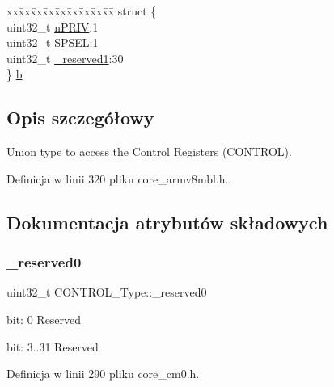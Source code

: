 \begin{DoxyCompactItemize}
\begin{tabbing}
\end{tabbing}\item 
\begin{tabbing}
xx\=xx\=xx\=xx\=xx\=xx\=xx\=xx\=xx\=\kill
struct \{\\
\>uint32\_t \hyperlink{union_c_o_n_t_r_o_l___type_a35c1732cf153b7b5c4bd321cf1de9605}{nPRIV}:1\\
\>uint32\_t \hyperlink{union_c_o_n_t_r_o_l___type_a8cc085fea1c50a8bd9adea63931ee8e2}{SPSEL}:1\\
\>uint32\_t \hyperlink{union_c_o_n_t_r_o_l___type_aa7a5662079a447f801034d108f80ce49}{\_reserved1}:30\\
\} \hyperlink{union_c_o_n_t_r_o_l___type_a6103270c10459404985ad6561d199b48}{b}\\

\end{tabbing}\end{DoxyCompactItemize}


\subsection{Opis szczegółowy}
Union type to access the Control Registers (C\+O\+N\+T\+R\+OL). 

Definicja w linii 320 pliku core\+\_\+armv8mbl.\+h.



\subsection{Dokumentacja atrybutów składowych}
\mbox{\label{union_c_o_n_t_r_o_l___type_af8c314273a1e4970a5671bd7f8184f50}} 
\subsubsection{\texorpdfstring{\+\_\+reserved0}{\_reserved0}}
{\footnotesize\ttfamily uint32\+\_\+t C\+O\+N\+T\+R\+O\+L\+\_\+\+Type\+::\+\_\+reserved0}

bit\+: 0 Reserved

bit\+: 3..31 Reserved 

Definicja w linii 290 pliku core\+\_\+cm0.\+h.

\mbox{\label{union_c_o_n_t_r_o_l___type_aa7a5662079a447f801034d108f80ce49}} 
